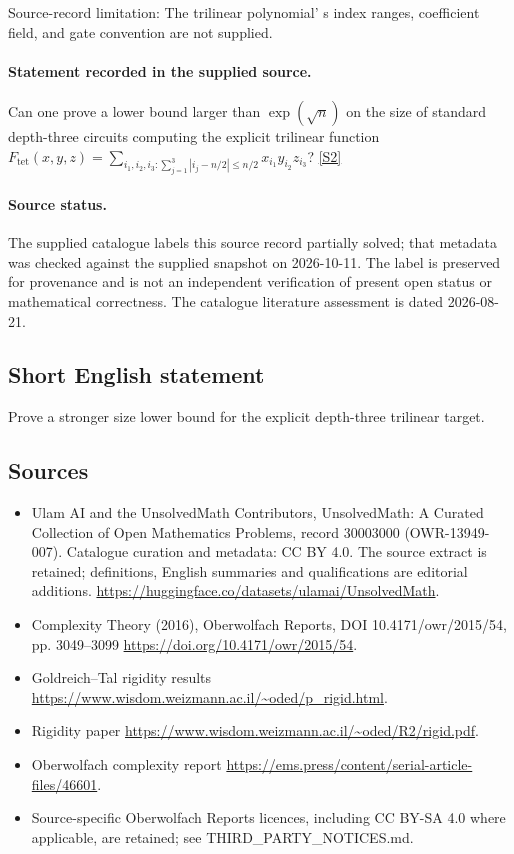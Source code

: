 \documentclass[11pt]{article}
\begin{document}
Source-record limitation: The trilinear polynomial' s index ranges, coefficient field, and gate convention are not supplied.
\paragraph{Statement recorded in the supplied source.}
Can one prove a lower bound larger than $\exp(\sqrt n)$ on the size of standard depth-three circuits computing the explicit trilinear function $F_{\mathrm{tet}}(x,y,z)=\sum_{i_1,i_2,i_3:\sum_{j=1}^3|i_j-n/2|\leq n/2}x_{i_1}y_{i_2}z_{i_3}$? \href{https://doi.org/10.4171/owr/2015/54}{[S2]}
\paragraph{Source status.}
The supplied catalogue labels this source record partially solved; that metadata was checked against the supplied snapshot on 2026-10-11. The label is preserved for provenance and is not an independent verification of present open status or mathematical correctness. The catalogue literature assessment is dated 2026-08-21.
\subsection{Short English statement}
Prove a stronger size lower bound for the explicit depth-three trilinear target.
\subsection{Sources}
\begin{itemize}
\item[S1] Ulam AI and the UnsolvedMath Contributors, UnsolvedMath: A Curated Collection of Open Mathematics Problems, record 30003000 (OWR-13949-007). Catalogue curation and metadata: CC BY 4.0. The source extract is retained; definitions, English summaries and qualifications are editorial additions.
\url{https://huggingface.co/datasets/ulamai/UnsolvedMath}.
\item[S2] Complexity Theory (2016), Oberwolfach Reports, DOI 10.4171/owr/2015/54, pp. 3049--3099
\url{https://doi.org/10.4171/owr/2015/54}.
\item[S3] Goldreich--Tal rigidity results
\url{https://www.wisdom.weizmann.ac.il/~oded/p_rigid.html}.
\item[S4] Rigidity paper
\url{https://www.wisdom.weizmann.ac.il/~oded/R2/rigid.pdf}.
\item[S5] Oberwolfach complexity report
\url{https://ems.press/content/serial-article-files/46601}.
\item Source-specific Oberwolfach Reports licences, including CC BY-SA 4.0 where applicable, are retained; see THIRD\_PARTY\_NOTICES.md.
\end{itemize}
\end{document}
